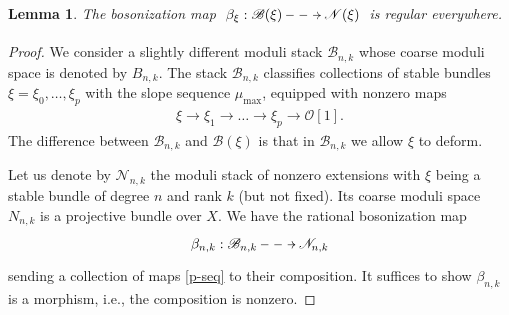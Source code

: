\documentclass[reqno]{amsart}
\DeclareMathOperator\C{\mathbb C}
\newtheorem{lemma}[theorem]{Lemma}
\theoremstyle{definition}
\theoremstyle{remark}
\newcommand{\Hom}{\operatorname{Hom}}
\newcommand{\OO}{{\mathcal O}}
\newcommand{\Spec}{\operatorname{Spec}}
\newcommand{\rk}{\operatorname{rk}}
\newcommand{\cO}{\mathcal{O}}
\newcommand{\sB}{\mathscr{B}}
\newcommand{\sN}{\mathscr{N}}
\numberwithin{equation}{section}
\begin{document}
\begin{lemma}
The bosonization map $\xymatrix{\beta_\xi: \sB(\xi)\ar@{-->}[r] & \sN(\xi)}$ is regular everywhere. 
\end{lemma}
\begin{proof}
We consider a slightly different moduli stack $\sB_{n,k}$ whose coarse moduli space is denoted by $B_{n,k}$.  
The stack $\sB_{n,k}$ classifies collections of stable bundles $\xi=\xi_0,\ldots,\xi_p$ with the slope sequence $\mu_{\max}$, equipped with nonzero maps
\begin{align}\label{p-seq}
\xi\to \xi_1\to \ldots \to \xi_p\to \cO[1].
\end{align}
The difference between $\sB_{n,k}$ and $\sB(\xi)$ is that in $\sB_{n,k}$ we allow $\xi$ to deform. 

Let us denote by $\sN_{n,k}$ the moduli stack of nonzero extensions with $\xi$ being a stable bundle of degree $n$ and rank $k$ (but not fixed). Its coarse moduli space $N_{n,k}$ is a projective bundle over $X$. We have the rational bosonization map 
$$\xymatrix{\beta_{n,k}: \sB_{n,k}\ar@{-->}[r] & \sN_{n,k}}$$
sending a collection of maps \eqref{p-seq} to their composition.
It suffices to show $\beta_{n,k}$ is a morphism, i.e., the composition is nonzero.



\end{proof}
\end{document}
